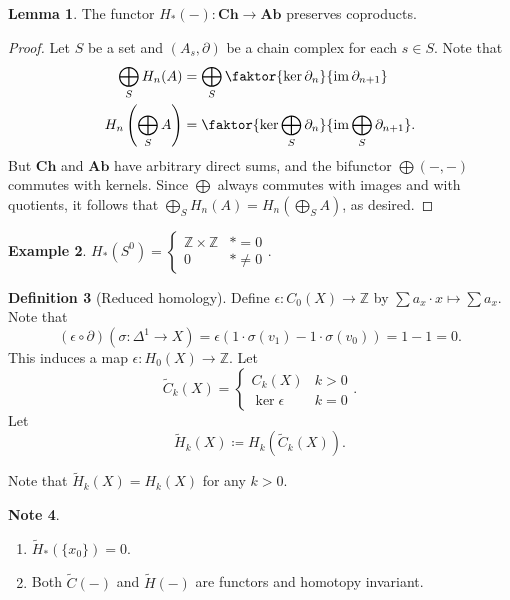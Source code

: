 \documentclass[10pt,letterpaper,cm]{nupset}
\theoremstyle{definition}
\newtheorem{definition}{Definition}[subsection]
\newtheorem{exmp}[definition]{Example}
\newtheorem{note}[definition]{Note}
\theoremstyle{theorem}
\newtheorem{lemma}[definition]{Lemma}
\theoremstyle{remark}
\newcommand{\Z}{\mathbb Z}
\newcommand{\1}{\mathbb{1}}
\newcommand{\0}{\vec 0}
\DeclareMathOperator{\im}{im}
\begin{document}
\begin{lemma}
The functor $H_{\ast}(-) : \mathbf{Ch} \to \mathbf{Ab}$ preserves coproducts. 
\end{lemma}
\begin{proof}
Let $S$ be a set and $\left(A_s, \partial\right)$ be a chain complex for each $s\in S$. Note that 
\begin{align*}
\bigoplus_S H_n(A) &= \bigoplus_S \faktor{\ker{\partial_n}}{\im{\partial_{n+1}}}
\\ H_n\left(\bigoplus_S A\right) &= \faktor{\ker{\bigoplus_S \partial_n}}{\im{\bigoplus_S \partial_{n+1}}}.
\end{align*} But $\mathbf{Ch}$ and $\mathbf{Ab}$ have arbitrary direct sums, and the bifunctor $\bigoplus (-,-)$ commutes with kernels. Since $\bigoplus$ always commutes with images and with quotients, it follows that $\bigoplus_S H_n(A) = H_n\left(\bigoplus_S A\right)$, as desired. 
\end{proof}


\begin{exmp}
$H_{\ast}(S^0) = \begin{cases} \Z \times \Z & \ast = 0 \\ 0 & \ast \ne 0 \end{cases}.$
\end{exmp}

\begin{definition}[Reduced homology]
Define $\epsilon :C_0(X) \to \Z$ by ${\sum {a_x \cdot x}} \mapsto \sum a_x$. Note that $$\left(\epsilon \circ \partial\right)\left(\sigma : \Delta^1 \to X\right) = \epsilon(1 \cdot \sigma(v_1) - 1 \cdot \sigma(v_0)) = 1-1 =0.$$ This induces a map $\epsilon : H_0(X) \to \Z$. Let $$\widetilde{C}_k(X) = \begin{cases} C_k(X) & k >0 \\ \ker{\epsilon} & k =0 \end{cases}.$$ Let $$\widetilde{H}_k(X) \coloneqq H_k\left(\widetilde{C}_k(X)\right).$$ 
\end{definition}

Note that $\widetilde{H}_k(X) = H_k(X)$ for any $k>0$.

\begin{note} $ $
\begin{enumerate}
\item $\widetilde{H}_{\ast}(\{x_0\}) =0$.
\item Both $\widetilde{C}(-)$ and $\widetilde{H}(-)$ are functors and homotopy invariant.
\end{enumerate}
\end{note}
\end{document}
